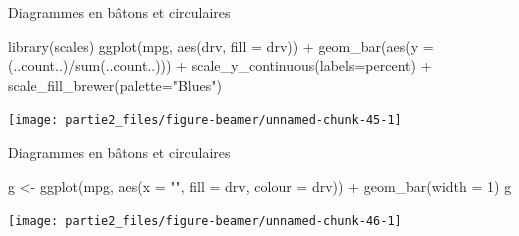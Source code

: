 \documentclass[12pt,ignorenonframetext,]{beamer}
\newenvironment{Shaded}{}{}
\newcommand{\KeywordTok}[1]{\textcolor[rgb]{0.00,0.00,1.00}{#1}}
\newcommand{\DataTypeTok}[1]{#1}
\newcommand{\DecValTok}[1]{#1}
\newcommand{\StringTok}[1]{\textcolor[rgb]{0.00,0.50,0.50}{#1}}
\newcommand{\OperatorTok}[1]{#1}
\newcommand{\NormalTok}[1]{#1}
\renewenvironment{Shaded}{\begin{snugshade}}{\end{snugshade}}
\begin{document}
\begin{frame}[fragile]{Diagrammes en bâtons et circulaires}

\footnotesize \center

\begin{Shaded}
\begin{Highlighting}[]
\KeywordTok{library}\NormalTok{(scales)}
\KeywordTok{ggplot}\NormalTok{(mpg, }\KeywordTok{aes}\NormalTok{(drv, }\DataTypeTok{fill =}\NormalTok{ drv)) }\OperatorTok{+}\StringTok{ }
\StringTok{  }\KeywordTok{geom_bar}\NormalTok{(}\KeywordTok{aes}\NormalTok{(}\DataTypeTok{y =}\NormalTok{ (..count..)}\OperatorTok{/}\KeywordTok{sum}\NormalTok{(..count..))) }\OperatorTok{+}
\StringTok{  }\KeywordTok{scale_y_continuous}\NormalTok{(}\DataTypeTok{labels=}\NormalTok{percent) }\OperatorTok{+}
\StringTok{  }\KeywordTok{scale_fill_brewer}\NormalTok{(}\DataTypeTok{palette=}\StringTok{"Blues"}\NormalTok{)}
\end{Highlighting}
\end{Shaded}

\texttt{[image: partie2\_files/figure-beamer/unnamed-chunk-45-1]}

\end{frame}

\begin{frame}[fragile]{Diagrammes en bâtons et circulaires}

\footnotesize \center

\begin{Shaded}
\begin{Highlighting}[]
\NormalTok{g <-}\StringTok{ }\KeywordTok{ggplot}\NormalTok{(mpg, }\KeywordTok{aes}\NormalTok{(}\DataTypeTok{x =} \StringTok{""}\NormalTok{, }\DataTypeTok{fill =}\NormalTok{ drv, }\DataTypeTok{colour =}\NormalTok{ drv)) }\OperatorTok{+}\StringTok{ }
\StringTok{  }\KeywordTok{geom_bar}\NormalTok{(}\DataTypeTok{width =} \DecValTok{1}\NormalTok{)}
\NormalTok{g}
\end{Highlighting}
\end{Shaded}

\texttt{[image: partie2\_files/figure-beamer/unnamed-chunk-46-1]}

\end{frame}
\end{document}
